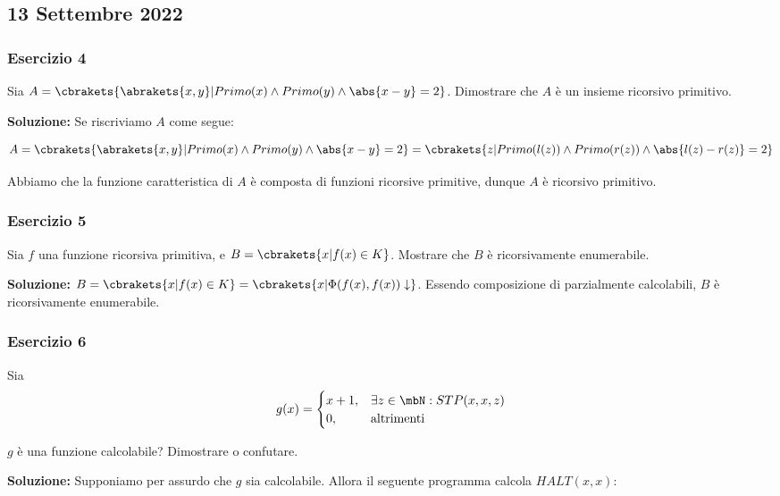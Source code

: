 \subsection{13 Settembre 2022}

\subsubsection{Esercizio 4}

Sia \(A = \cbrakets{\abrakets{x,y} \vert Primo(x) \land Primo (y) \land \abs{x-y}=2}\). Dimostrare che \(A\) è un insieme ricorsivo primitivo.

\textbf{Soluzione: } Se riscriviamo \(A\) come segue:

\begin{equation}
  A = \cbrakets{\abrakets{x,y} \vert Primo(x) \land Primo (y) \land \abs{x-y}=2} = \cbrakets{z \vert Primo(l(z)) \land Primo (r(z)) \land \abs{l(z)-r(z)}=2}
\end{equation}

Abbiamo che la funzione caratteristica di \(A\) è composta di funzioni ricorsive primitive, dunque \(A\) è ricorsivo primitivo.

\subsubsection{Esercizio 5}

Sia \(f\) una funzione ricorsiva primitiva, e \(B=\cbrakets{x \vert f(x) \in K}\). Mostrare che \(B\) è ricorsivamente enumerabile.

\textbf{Soluzione: } \(B=\cbrakets{x \vert f(x) \in K}=\cbrakets{x \vert \Phi(f(x),f(x)) \downarrow}\). Essendo composizione di parzialmente calcolabili, \(B\) è ricorsivamente enumerabile.

\subsubsection{Esercizio 6}

Sia
\begin{equation}
  g(x)=\begin{cases}
    x+1, & \exists z \in \mbN: STP(x,x,z)\\
    0, &\text{altrimenti}
  \end{cases}
\end{equation}

\(g\) è una funzione calcolabile? Dimostrare o confutare.

\textbf{Soluzione: } Supponiamo per assurdo che \(g\) sia calcolabile. Allora il seguente programma calcola \(HALT(x,x)\):

